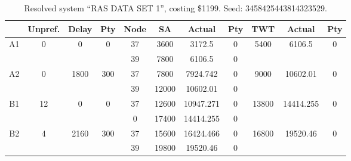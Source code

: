 \begin{sidewaystable}
\footnotesize
\caption{Resolved system ``RAS DATA SET 1'', costing \$1199. Seed: 3458425443814323529.}
\centering
\begin{tabular}{c||c|c|c||c|c|c|c||c|c|c}
  \hline \hline
  &
  Unpref. & 
  Delay &
  Pty &
  Node &
  SA &
  Actual &
  Pty &
  TWT &
  Actual &
  Pty \\
      \hline
      \multirow{2}{*}{A1} &
      \multirow{2}{*}{0} &
      \multirow{2}{*}{0} &
      \multirow{2}{*}{0} &
      37 &
      3600 &
        3172.5 &
        0 &
      \multirow{2}{*}{5400} &
        \multirow{2}{*}{6106.5} &
        \multirow{2}{*}{0}
      \\
      \cline{5-8}
       &
       &
       &
       &
      39 &
      7800 &
        6106.5 &
        0 &
      
         &
        
      \\
      \hline
      \multirow{2}{*}{A2} &
      \multirow{2}{*}{0} &
      \multirow{2}{*}{1800} &
      \multirow{2}{*}{300} &
      37 &
      7800 &
        7924.742 &
        0 &
      \multirow{2}{*}{9000} &
        \multirow{2}{*}{10602.01} &
        \multirow{2}{*}{0}
      \\
      \cline{5-8}
       &
       &
       &
       &
      39 &
      12000 &
        10602.01 &
        0 &
      
         &
        
      \\
      \hline
      \multirow{2}{*}{B1} &
      \multirow{2}{*}{12} &
      \multirow{2}{*}{0} &
      \multirow{2}{*}{0} &
      37 &
      12600 &
        10947.271 &
        0 &
      \multirow{2}{*}{13800} &
        \multirow{2}{*}{14414.255} &
        \multirow{2}{*}{0}
      \\
      \cline{5-8}
       &
       &
       &
       &
      0 &
      17400 &
        14414.255 &
        0 &
      
         &
        
      \\
      \hline
      \multirow{2}{*}{B2} &
      \multirow{2}{*}{4} &
      \multirow{2}{*}{2160} &
      \multirow{2}{*}{300} &
      37 &
      15600 &
        16424.466 &
        0 &
      \multirow{2}{*}{16800} &
        \multirow{2}{*}{19520.46} &
        \multirow{2}{*}{0}
      \\
      \cline{5-8}
       &
       &
       &
       &
      39 &
      19800 &
        19520.46 &
        0 &
      

\end{tabular}
\end{sidewaystable}
